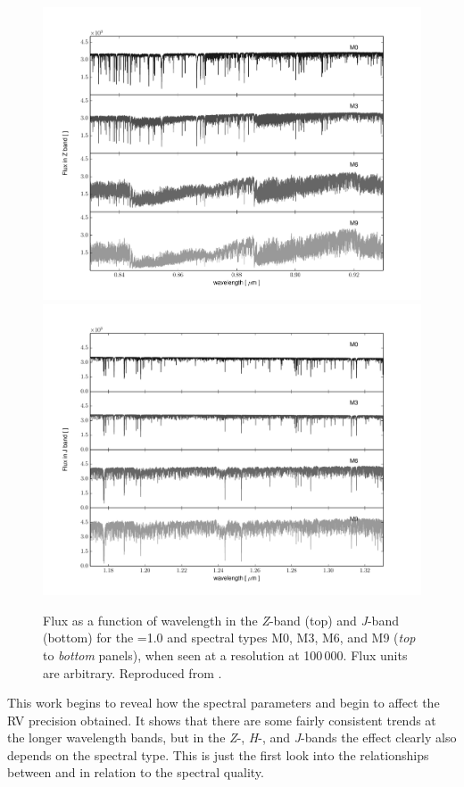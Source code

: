 \begin{figure}
    \centering
    \includegraphics[width=0.9\linewidth]{figures/information-content/figueria_2016_figures/Zband}\\
    \includegraphics[width=0.9\linewidth]{figures/information-content/figueria_2016_figures/Jband}
    \caption{Flux as a function of wavelength in the \emph{Z}-band (top) and \emph{J}-band (bottom) for the \Vsini{}=1.0\kmps{} and spectral types {M0}, {M3}, {M6}, and {M9} (\textit{top} to \textit{bottom} panels), when seen at a resolution at 100\,000.
        Flux units are arbitrary.
        Reproduced from \citet{figueira_radial_2016}.}
    \label{fig:z_and_j_spectra}
\end{figure}

This work begins to reveal how the spectral parameters \Logg{} and \feh{} begin to affect the {RV} precision obtained.
It shows that there are some fairly consistent trends at the longer wavelength bands, but in the \emph{Z}-, \emph{H}-, and \emph{J}-bands the effect clearly also depends on the spectral type.
This is just the first look into the relationships between \feh{} and \Logg{} in relation to the spectral quality.

